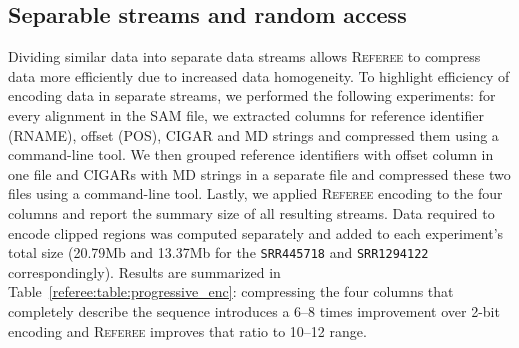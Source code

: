 \documentclass[12pt]{cmuthesis}
\newcommand{\refer}{\textsc{Referee}\xspace}
\begin{document}





  \subsection{Separable streams and random access}



  Dividing similar data into separate data streams allows \refer to compress data more efficiently due to increased data homogeneity. To highlight efficiency of encoding data in separate streams, we performed the following experiments: for every alignment in the SAM file, we extracted columns for reference identifier (RNAME), offset (POS), CIGAR and MD strings and compressed them using a command-line tool. We then grouped reference identifiers with offset column in one file and CIGARs with MD strings in a separate file and compressed these two files using a command-line tool. Lastly, we applied \refer encoding to the four columns and report the summary size of all resulting streams. Data required to encode clipped regions was computed separately and added to each experiment's total size (20.79Mb and 13.37Mb for the \texttt{SRR445718} and \texttt{SRR1294122} correspondingly). Results are summarized in Table~\ref{referee:table:progressive_enc}: compressing the four columns that completely describe the sequence introduces a 6--8 times improvement over 2-bit encoding and \refer improves that ratio to 10--12 range.
\end{document}
